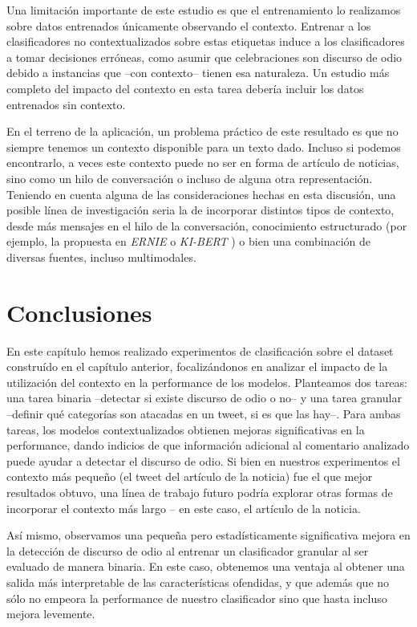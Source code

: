 Una limitación importante de este estudio es que el entrenamiento lo realizamos sobre datos entrenados únicamente observando el contexto. Entrenar a los clasificadores no contextualizados sobre estas etiquetas induce a los clasificadores a tomar decisiones erróneas, como asumir que celebraciones son discurso de odio debido a instancias que --con contexto-- tienen esa naturaleza. Un estudio más completo del impacto del contexto en esta tarea debería incluir los datos entrenados sin contexto.

En el terreno de la aplicación, un problema práctico de este resultado es que no siempre tenemos un contexto disponible para un texto dado. Incluso si podemos encontrarlo, a veces este contexto puede no ser en forma de artículo de noticias, sino como un hilo de conversación o incluso de alguna otra representación. Teniendo en cuenta alguna de las consideraciones hechas en esta discusión, una posible línea de investigación seria la de incorporar distintos tipos de contexto, desde más mensajes en el hilo de la conversación, conocimiento estructurado (por ejemplo, la propuesta en \emph{ERNIE} \cite{zhang2019ernie} o \emph{KI-BERT} \cite{faldu2021ki}) o bien una combinación de diversas fuentes, incluso multimodales.

\section{Conclusiones}

En este capítulo hemos realizado experimentos de clasificación sobre el dataset construído en el capítulo anterior, focalizándonos en analizar el impacto de la utilización del contexto en la performance de los modelos. Planteamos dos tareas: una tarea binaria --detectar si existe discurso de odio o no-- y una tarea granular --definir qué categorías son atacadas en un tweet, si es que las hay--. Para ambas tareas, los modelos contextualizados obtienen mejoras significativas en la performance, dando indicios de que información adicional al comentario analizado puede ayudar a detectar el discurso de odio. Si bien en nuestros experimentos el contexto más pequeño (el tweet del artículo de la noticia) fue el que mejor resultados obtuvo, una línea de trabajo futuro podría explorar otras formas de incorporar el contexto más largo -- en este caso, el artículo de la noticia.

Así mismo, observamos una pequeña pero estadísticamente significativa mejora en la detección de discurso de odio al entrenar un clasificador granular al ser evaluado de manera binaria. En este caso, obtenemos una ventaja al obtener una salida más interpretable de las características ofendidas, y que además que no sólo no empeora la performance de nuestro clasificador sino que hasta incluso mejora levemente.

